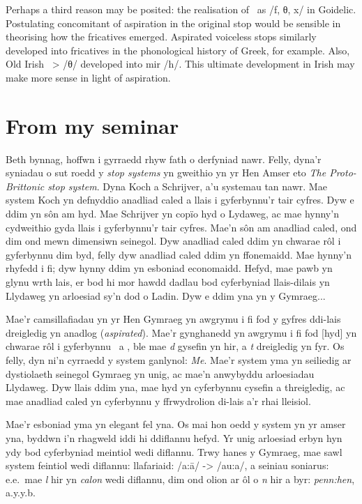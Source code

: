 Perhaps a third reason may be posited: the realisation of \lT\ as /f, θ, x/ in Goidelic. Postulating concomitant of aspiration in the original stop would be sensible in theorising how the fricatives emerged. Aspirated voiceless stops similarly developed into fricatives in the phonological history of Greek, for example. Also, Old Irish \lT\ > /θ/ developed into \gls{mir} /h/. This ultimate development in Irish may make more sense in light of aspiration.


\section{From my seminar}
Beth bynnag, hoffwn i gyrraedd rhyw fath o derfyniad nawr. Felly, dyna'r syniadau o sut roedd y \textit{stop systems} yn gweithio yn yr Hen Amser eto \emph{The Proto-Brittonic stop system}. Dyna Koch a Schrijver, a'u systemau tan nawr. Mae system Koch yn defnyddio anadliad caled a llais i gyferbynnu'r tair cyfres. Dyw e ddim yn s\^on am hyd. Mae Schrijver yn cop\"io hyd o Lydaweg, ac mae hynny'n cydweithio gyda llais i gyferbynnu'r tair cyfres. Mae'n s\^on am anadliad caled, ond dim ond mewn dimensiwn seinegol. Dyw anadliad caled ddim yn chwarae r\^ol i gyferbynnu dim byd, felly dyw anadliad caled ddim yn ffonemaidd. Mae hynny'n rhyfedd i fi; dyw hynny ddim yn esboniad economaidd. Hefyd, mae pawb yn glynu wrth lais, er bod hi mor hawdd dadlau bod cyferbyniad llais-dilais yn Llydaweg yn arloesiad sy'n dod o Ladin. Dyw e ddim yna yn y Gymraeg...

Mae'r camsillafiadau yn yr Hen Gymraeg yn awgrymu i fi fod y gyfres ddi-lais dreigledig yn anadlog (\textit{aspirated}). Mae'r gynghanedd yn awgrymu i fi fod [hyd] yn chwarae r\^ol i gyferbynnu \xD\ a \lT, ble mae \textit{d} gysefin yn hir, a \textit{t} dreigledig yn fyr. Os felly, dyn ni'n cyrraedd y system ganlynol: \emph{Me}. Mae'r system yma yn seiliedig ar dystiolaeth seinegol Gymraeg yn unig, ac mae'n anwybyddu arloesiadau Llydaweg. Dyw llais ddim yna, mae hyd yn cyferbynnu cysefin a threigledig, ac mae anadliad caled yn cyferbynnu y ffrwydrolion di-lais a'r rhai lleisiol.

Mae'r esboniad yma yn elegant fel yna. Os mai hon oedd y system yn yr amser yna, byddwn i'n rhagweld iddi hi ddiflannu hefyd. Yr unig arloesiad erbyn hyn ydy bod cyferbyniad meintiol wedi diflannu. Trwy hanes y Gymraeg, mae sawl system feintiol wedi diflannu: llafariaid: /a:\=a/ -> /au:a/, a seiniau soniarus: e.e.\ mae \textit{l} hir yn \textit{calon} wedi diflannu, dim ond olion ar \^ol o \textit{n} hir a byr: \textit{penn:hen}, a.y.y.b.

